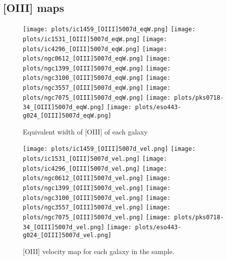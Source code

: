 \documentclass[fleqn,usenatbib,useAMS]{mnras}
\begin{document}
	\subsection{[OIII] maps}
		\label{subsec:OIIImaps}

		\begin{figure*}
			\centering
			\texttt{[image: plots/ic1459\_[OIII]5007d\_eqW.png]}
			\texttt{[image: plots/ic1531\_[OIII]5007d\_eqW.png]}
			\texttt{[image: plots/ic4296\_[OIII]5007d\_eqW.png]}
			\texttt{[image: plots/ngc0612\_[OIII]5007d\_eqW.png]}
			\texttt{[image: plots/ngc1399\_[OIII]5007d\_eqW.png]}
			\texttt{[image: plots/ngc3100\_[OIII]5007d\_eqW.png]}
			\texttt{[image: plots/ngc3557\_[OIII]5007d\_eqW.png]}
			\texttt{[image: plots/ngc7075\_[OIII]5007d\_eqW.png]}
			\texttt{[image: plots/pks0718-34\_[OIII]5007d\_eqW.png]}
			\texttt{[image: plots/eso443-g024\_[OIII]5007d\_eqW.png]}
			\caption{Equivalent width of [OIII] of each galaxy}
			\label{fig:OIII_eqw}
		\end{figure*}

		\begin{figure*}
			\centering
			\texttt{[image: plots/ic1459\_[OIII]5007d\_vel.png]}
			\texttt{[image: plots/ic1531\_[OIII]5007d\_vel.png]}
			\texttt{[image: plots/ic4296\_[OIII]5007d\_vel.png]}
			\texttt{[image: plots/ngc0612\_[OIII]5007d\_vel.png]}
			\texttt{[image: plots/ngc1399\_[OIII]5007d\_vel.png]}
			\texttt{[image: plots/ngc3100\_[OIII]5007d\_vel.png]}
			\texttt{[image: plots/ngc3557\_[OIII]5007d\_vel.png]}
			\texttt{[image: plots/ngc7075\_[OIII]5007d\_vel.png]}
			\texttt{[image: plots/pks0718-34\_[OIII]5007d\_vel.png]}
			\texttt{[image: plots/eso443-g024\_[OIII]5007d\_vel.png]}
			\caption{[OIII] velocity map for each galaxy in the sample.}
			\label{fig:OIII_vel}
		\end{figure*}
\end{document}
